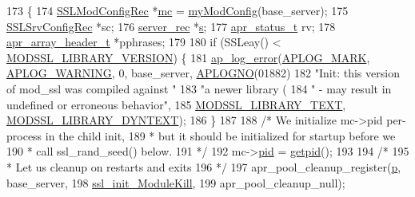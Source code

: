 \begin{DoxyCode}
173 \{
174     \hyperlink{structSSLModConfigRec}{SSLModConfigRec} *\hyperlink{group__APR__Util__MC_ga1cf8c9d89cfb411f224cae715e8c2aaa}{mc} = \hyperlink{group__MOD__SSL__PRIVATE_ga94fd702ebef715ed37309b2be90c68e8}{myModConfig}(base\_server);
175     \hyperlink{structSSLSrvConfigRec}{SSLSrvConfigRec} *sc;
176     \hyperlink{structserver__rec}{server\_rec} *\hyperlink{group__APACHE__CORE__LISTEN_ga9359ed159c8b295541e3770172d34550}{s};
177     \hyperlink{group__apr__errno_gaa5105fa83cc322f09382292db8b47593}{apr\_status\_t} rv;
178     \hyperlink{structapr__array__header__t}{apr\_array\_header\_t} *pphrases;
179 
180     \textcolor{keywordflow}{if} (SSLeay() < \hyperlink{group__MOD__SSL__UTIL_ga69e719c4e3cc5f9d8038c18a7240482f}{MODSSL\_LIBRARY\_VERSION}) \{
181         \hyperlink{group__APACHE__CORE__LOG_ga5e6676c87418af7a1d323a116c78ecb4}{ap\_log\_error}(\hyperlink{group__APACHE__CORE__LOG_ga655e126996849bcb82e4e5a14c616f4a}{APLOG\_MARK}, \hyperlink{group__APACHE__CORE__LOG_ga73e14aeff380a8a01c66d528162026fe}{APLOG\_WARNING}, 0, base\_server, 
      \hyperlink{group__APACHE__CORE__LOG_ga1dee8a07e06bc5b3de8b89662c2cd666}{APLOGNO}(01882)
182                      \textcolor{stringliteral}{"Init: this version of mod\_ssl was compiled against "}
183                      \textcolor{stringliteral}{"a newer library (%
184                      \textcolor{stringliteral}{" - may result in undefined or erroneous behavior"},
185                      \hyperlink{group__MOD__SSL__UTIL_ga8483b8fd1bc5ff050b4c0154b3f1cd0f}{MODSSL\_LIBRARY\_TEXT}, 
      \hyperlink{group__MOD__SSL__UTIL_ga7199e41b3460675e9b97e9582471c8e9}{MODSSL\_LIBRARY\_DYNTEXT});
186     \}
187 
188     \textcolor{comment}{/* We initialize mc->pid per-process in the child init,}
189 \textcolor{comment}{     * but it should be initialized for startup before we}
190 \textcolor{comment}{     * call ssl\_rand\_seed() below.}
191 \textcolor{comment}{     */}
192     mc->\hyperlink{structSSLModConfigRec_a502680db48a6c7c3c15f880873fae223}{pid} = \hyperlink{group__APACHE__OS__NETWARE_gacf2940fe9f29eb438f40629fd4fbb2b6}{getpid}();
193 
194     \textcolor{comment}{/*}
195 \textcolor{comment}{     * Let us cleanup on restarts and exits}
196 \textcolor{comment}{     */}
197     apr\_pool\_cleanup\_register(\hyperlink{group__APACHE__CORE__MPM_ga5cd91701e5c167f2b1a38e70ab57817e}{p}, base\_server,
198                               \hyperlink{group__MOD__SSL__PRIVATE_ga5add0a1e14930a96409c4cb0995b8c3c}{ssl\_init\_ModuleKill},
199                               apr\_pool\_cleanup\_null);
}
\end{DoxyCode}
